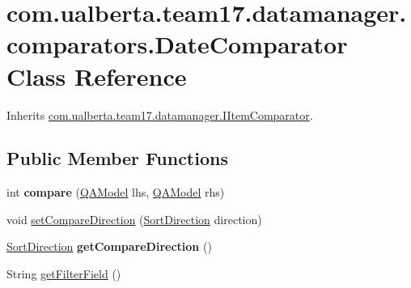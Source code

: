\hypertarget{classcom_1_1ualberta_1_1team17_1_1datamanager_1_1comparators_1_1_date_comparator}{\section{com.\+ualberta.\+team17.\+datamanager.\+comparators.\+Date\+Comparator Class Reference}
\label{classcom_1_1ualberta_1_1team17_1_1datamanager_1_1comparators_1_1_date_comparator}
}


Inherits \hyperlink{interfacecom_1_1ualberta_1_1team17_1_1datamanager_1_1_i_item_comparator}{com.\+ualberta.\+team17.\+datamanager.\+I\+Item\+Comparator}.

\subsection*{Public Member Functions}
\begin{DoxyCompactItemize}
\item 
\hypertarget{classcom_1_1ualberta_1_1team17_1_1datamanager_1_1comparators_1_1_date_comparator_a63a696191e0312a2b1f579f7e7772aa5}{int {\bfseries compare} (\hyperlink{classcom_1_1ualberta_1_1team17_1_1_q_a_model}{Q\+A\+Model} lhs, \hyperlink{classcom_1_1ualberta_1_1team17_1_1_q_a_model}{Q\+A\+Model} rhs)}\label{classcom_1_1ualberta_1_1team17_1_1datamanager_1_1comparators_1_1_date_comparator_a63a696191e0312a2b1f579f7e7772aa5}

\item 
void \hyperlink{classcom_1_1ualberta_1_1team17_1_1datamanager_1_1comparators_1_1_date_comparator_afa1ad74316c3ba235614ae7c3f0f1568}{set\+Compare\+Direction} (\hyperlink{enumcom_1_1ualberta_1_1team17_1_1datamanager_1_1_i_item_comparator_1_1_sort_direction}{Sort\+Direction} direction)
\item 
\hypertarget{classcom_1_1ualberta_1_1team17_1_1datamanager_1_1comparators_1_1_date_comparator_a37d218c255e8e7c0572720609c74866f}{\hyperlink{enumcom_1_1ualberta_1_1team17_1_1datamanager_1_1_i_item_comparator_1_1_sort_direction}{Sort\+Direction} {\bfseries get\+Compare\+Direction} ()}\label{classcom_1_1ualberta_1_1team17_1_1datamanager_1_1comparators_1_1_date_comparator_a37d218c255e8e7c0572720609c74866f}

\item 
String \hyperlink{classcom_1_1ualberta_1_1team17_1_1datamanager_1_1comparators_1_1_date_comparator_a5ef897a9cc18591863074689a9a493dd}{get\+Filter\+Field} ()
\end{DoxyCompactItemize}


